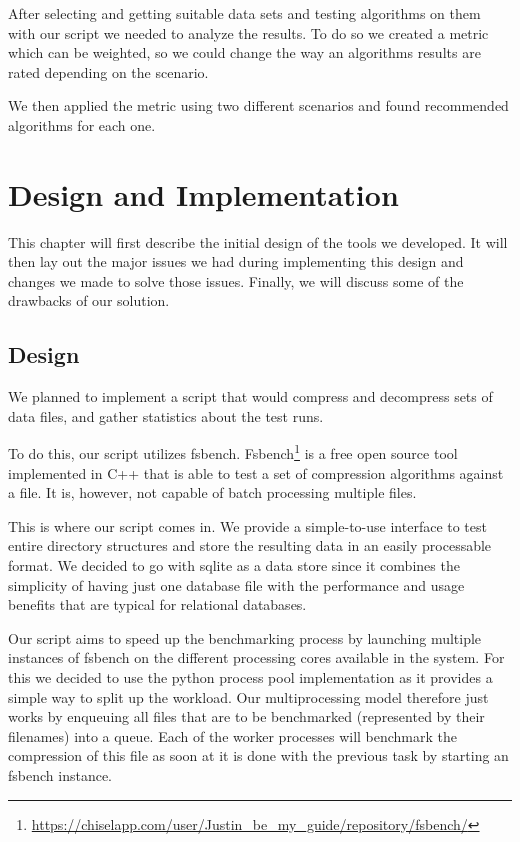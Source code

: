 \documentclass[
	12pt,
	a4paper,
	BCOR10mm,
	DIV14,
	listof=totoc,
	bibliography=totoc,
	headsepline
]{scrreprt}
\begin{document}
After selecting and getting suitable data sets and testing algorithms on them with our script we needed to analyze the results. To do so we created a metric which can be weighted, so we could change the way an algorithms results are rated depending on the scenario.

We then applied the metric using two different scenarios and found recommended algorithms for each one.

\chapter{Design and Implementation}
\label{Design}

This chapter will first describe the initial design of the tools we developed. It will then lay out the major issues we had during implementing this design and changes we made to solve those issues. Finally, we will discuss some of the drawbacks of our solution.

\section{Design}

We planned to implement a script that would compress and decompress sets of data files, and gather statistics about the test runs.

To do this, our script utilizes fsbench.  Fsbench\footnote{\url{https://chiselapp.com/user/Justin_be_my_guide/repository/fsbench/}} is a free open source tool implemented in C++ that is able to test a set of compression algorithms against a file. It is, however, not capable of batch processing multiple files.

This is where our script comes in. We provide a simple-to-use interface to test entire directory structures and store the resulting data in an easily processable format. We decided to go with sqlite as a data store since it combines the simplicity of having just one database file with the performance and usage benefits that are typical for relational databases.

Our script aims to speed up the benchmarking process by launching multiple instances of fsbench on the different processing cores available in the system.
For this we decided to use the python process pool implementation as it provides a simple way to split up the workload.
Our multiprocessing model therefore just works by enqueuing all files that are to be benchmarked (represented by their filenames) into a queue.
Each of the worker processes will benchmark the compression of this file as soon at it is done with the previous task by starting an fsbench instance.
\end{document}
